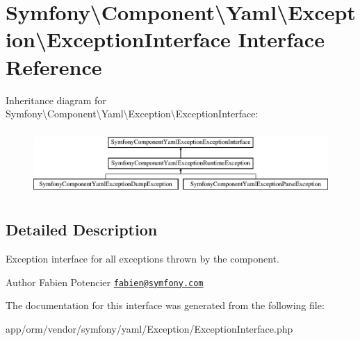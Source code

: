 \hypertarget{interfaceSymfony_1_1Component_1_1Yaml_1_1Exception_1_1ExceptionInterface}{}\section{Symfony\textbackslash{}Component\textbackslash{}Yaml\textbackslash{}Exception\textbackslash{}Exception\+Interface Interface Reference}
\label{interfaceSymfony_1_1Component_1_1Yaml_1_1Exception_1_1ExceptionInterface}
Inheritance diagram for Symfony\textbackslash{}Component\textbackslash{}Yaml\textbackslash{}Exception\textbackslash{}Exception\+Interface\+:\begin{figure}[H]
\begin{center}
\leavevmode
\includegraphics[height=2.500000cm]{interfaceSymfony_1_1Component_1_1Yaml_1_1Exception_1_1ExceptionInterface}
\end{center}
\end{figure}


\subsection{Detailed Description}
Exception interface for all exceptions thrown by the component.

\begin{DoxyAuthor}{Author}
Fabien Potencier \href{mailto:fabien@symfony.com}{\tt fabien@symfony.\+com} 
\end{DoxyAuthor}


The documentation for this interface was generated from the following file\+:\begin{DoxyCompactItemize}
\item 
app/orm/vendor/symfony/yaml/\+Exception/Exception\+Interface.\+php\end{DoxyCompactItemize}
